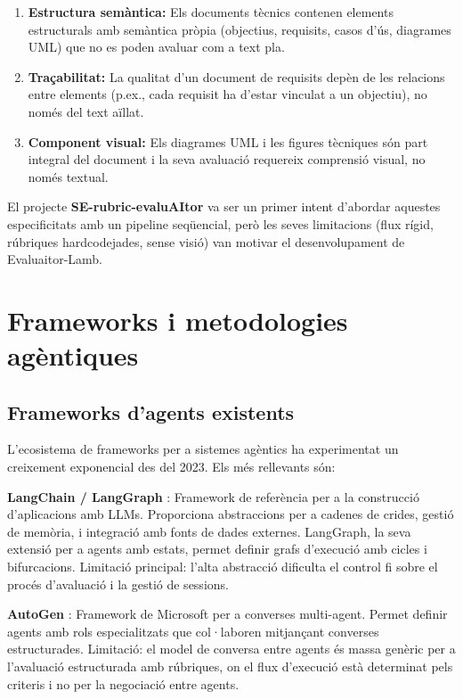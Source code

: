 \documentclass[12pt,a4paper,twoside]{report}
\begin{document}
\begin{enumerate}
    \item \textbf{Estructura sem\`antica:} Els documents t\`ecnics contenen elements estructurals amb sem\`antica pr\`opia (objectius, requisits, casos d'\'us, diagrames UML) que no es poden avaluar com a text pla.
    \item \textbf{Tra\c{c}abilitat:} La qualitat d'un document de requisits dep\`en de les relacions entre elements (p.ex., cada requisit ha d'estar vinculat a un objectiu), no nom\'es del text a\"illat.
    \item \textbf{Component visual:} Els diagrames UML i les figures t\`ecniques s\'on part integral del document i la seva avaluaci\'o requereix comprensi\'o visual, no nom\'es textual.
\end{enumerate}

El projecte \textbf{SE-rubric-evaluAItor} \cite{se-rubric} va ser un primer intent d'abordar aquestes especificitats amb un pipeline seq\"uencial, per\`o les seves limitacions (flux r\'igid, r\'ubriques hardcodejades, sense visi\'o) van motivar el desenvolupament de Evaluaitor-Lamb.

\section{Frameworks i metodologies ag\`entiques}
\label{sec:frameworks-agentics}

\subsection{Frameworks d'agents existents}
\label{subsec:frameworks}

L'ecosistema de frameworks per a sistemes ag\`entics ha experimentat un creixement exponencial des del 2023. Els m\'es rellevants s\'on:

\textbf{LangChain / LangGraph} \cite{langchain2024}: Framework de refer\`encia per a la construcci\'o d'aplicacions amb LLMs. Proporciona abstraccions per a cadenes de crides, gesti\'o de mem\`oria, i integraci\'o amb fonts de dades externes. LangGraph, la seva extensi\'o per a agents amb estats, permet definir grafs d'execuci\'o amb cicles i bifurcacions. Limitaci\'o principal: l'alta abstracci\'o dificulta el control fi sobre el proc\'es d'avaluaci\'o i la gesti\'o de sessions.

\textbf{AutoGen} \cite{wu2023}: Framework de Microsoft per a converses multi-agent. Permet definir agents amb rols especialitzats que col·laboren mitjan\c{c}ant converses estructurades. Limitaci\'o: el model de conversa entre agents \'es massa gen\`eric per a l'avaluaci\'o estructurada amb r\'ubriques, on el flux d'execuci\'o est\`a determinat pels criteris i no per la negociaci\'o entre agents.
\end{document}

